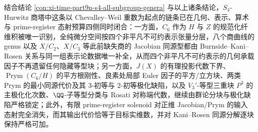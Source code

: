 \noindent
结合结论 \ref{con:xi-time-part9n-s4-all-subgroup-genera} 与以上诸条结论，\(S_4\)-Hurwitz 商塔中这条以 Chevalley--Weil 重数为起点的链条已在几何、表示、算术与 prime-register 态射预算四侧同时闭合：一方面，\(C_6\) 作为 \(H\) 与 \(Z\) 的规范化纤维积被唯一识别，全纯微分空间按四个非平凡不可约表示张量分层，八个商曲线的 genus 以及 \(X/C_2\)、\(X/C_3\) 等此前缺失商的 Jacobian 同源型都由 Burnside--Kani--Rosen 关系与同一组表示论数据唯一补全，从而四个非平凡不可约表示的几何承载因子不再遗留任何隐藏等型块；另一方面，\(J(X)\) 的有理投影代数下界、\(\operatorname{Prym}(C_6/H)\) 的平方根刚性、良素处局部 Euler 因子的平方/立方块、两类 Prym 的最小同源代价及其 \(3\)-初等与 \(2\)-初等极化缺陷，以及 \(V_3'\)-等型三重块 \(P^3\) 的主极化化次数、\(\QQ\)-子等型分类与 Rosati 对称端代数，继续由群论分块与极化缺陷严格锁定；此外，有限 prime-register solenoid 对正维 Jacobian/Prym 的输入态射完全消失，而其输出代价恰等于目标实维数，并对 Kani--Rosen 同源分解逐块保持严格可加。

\endinput
